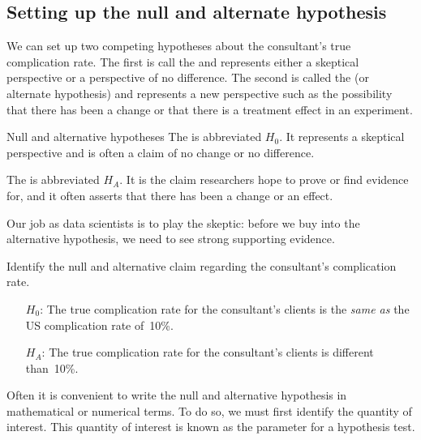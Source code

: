\subsection{Setting up the null and alternate hypothesis}

We can set up two competing hypotheses about the consultant's true complication rate. The first is call the  and represents either a skeptical perspective or a perspective of no difference. The second is called the  (or alternate hypothesis) and represents a new perspective such as the possibility that there has been a change or that there is a treatment effect in an experiment.

\begin{onebox}{Null and alternative hypotheses}
The  is abbreviated $H_0$. It represents a skeptical perspective and is often a claim of no change or no difference. \vspace{3mm}

The  is abbreviated $H_A$. It is the claim researchers hope to prove or find evidence for, and it often asserts that there has been a change or an effect. \vspace{3mm}

Our job as data scientists is to play the skeptic: before we buy into the alternative hypothesis, we need to see strong supporting evidence.
\end{onebox}

\begin{examplewrap}\begin{nexample}{Identify the null and alternative claim regarding the consultant's complication rate.}
\begin{itemize}
\item[$H_0$:] The true complication rate for the consultant's clients is the \emph{same as} the US complication rate of~10\%.
\item[$H_A$:] The true complication rate for the consultant's clients is different than~10\%.
\end{itemize}
\end{nexample}\end{examplewrap}

Often it is convenient to write the null and alternative hypothesis in mathematical or numerical terms. To do so, we must first identify the quantity of interest. This quantity of interest is known as the parameter for a hypothesis test.


